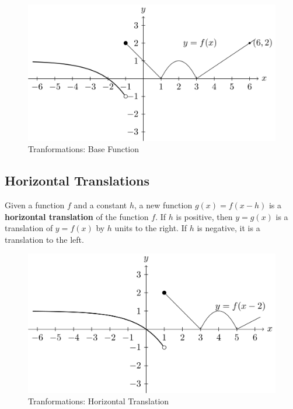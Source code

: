 \documentclass[
]{book}
\theoremstyle{definition}
\theoremstyle{definition}
\theoremstyle{definition}
\theoremstyle{definition}
\theoremstyle{remark}
\begin{document}
\begin{figure}

{\centering \includegraphics[width=0.8\linewidth]{tikz/base-function} 

}

\caption{Tranformations: Base Function}\label{fig:base-function}
\end{figure}

\hypertarget{horizontal-translations}{%
\subsection{Horizontal Translations}\label{horizontal-translations}}

Given a function \(f\) and a constant \(h\), a new function \(g(x)=f(x-h)\) is a \textbf{horizontal translation} of the function \(f\). If \(h\) is positive, then \(y=g(x)\) is a translation of \(y=f(x)\) by \(h\) units to the right. If \(h\) is negative, it is a translation to the left.

\begin{figure}

{\centering \includegraphics[width=0.8\linewidth]{tikz/horizontal-translation} 

}

\caption{Tranformations: Horizontal Translation}\label{fig:horizontal-translation}
\end{figure}
\end{document}
